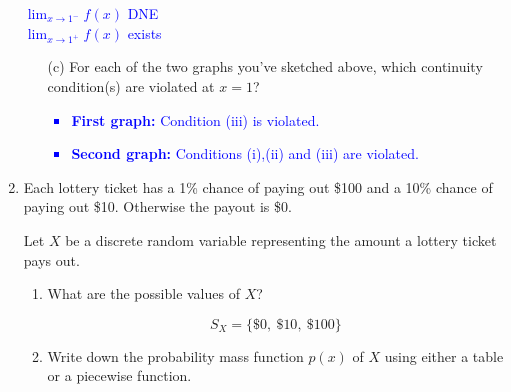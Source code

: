 \documentclass[11pt]{article}
\begin{document}
\begin{enumerate}
\begin{minipage}[t]{0.45\textwidth}
\begin{center}

\textcolor{blue}{
$\displaystyle \lim_{x\to 1^-} f(x)$ DNE\\
$\displaystyle \lim_{x\to 1^+} f(x)$ exists
}
\end{center}
\end{minipage}

\begin{enumerate}
\item[(c)] For each of the two graphs you've sketched above, which continuity condition(s) are violated at $x=1$?

\textcolor{blue}{
\begin{itemize}
    \item \textbf{First graph:} Condition (iii) is violated.
    \item \textbf{Second graph:} Conditions (i),(ii) and (iii) are violated.
\end{itemize}
}
\end{enumerate}


\newpage


\item Each lottery ticket has a 1\% chance of paying out \$100 and a 10\% chance of paying out \$10. Otherwise the payout is \$0.

Let $X$ be a discrete random variable representing the amount a lottery ticket pays out.

\begin{enumerate}
    \item What are the possible values of $X$?

    \vspace{0.5cm}
    {\color{blue} $$S_X = \big\{ \$0,\ \$10,\ \$100\big\}$$} 
    \vspace{0.5cm}

    \item Write down the probability mass function $p(x)$ of $X$ using either a table or a piecewise function.

    \vspace{0.5cm}
    \begin{center}
        \color{blue}
 

\end{center}
\end{enumerate}
\end{enumerate}
\end{document}
